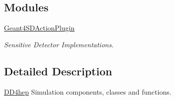 \subsection*{Modules}
\begin{DoxyCompactItemize}
\item 
\hyperlink{group___geant4_s_d_action_plugin}{Geant4SDActionPlugin}


\begin{DoxyCompactList}\small\item\em Sensitive Detector Implementations. \item\end{DoxyCompactList}\end{DoxyCompactItemize}


\subsection{Detailed Description}
\hyperlink{namespace_d_d4hep}{DD4hep} Simulation components, classes and functions. 